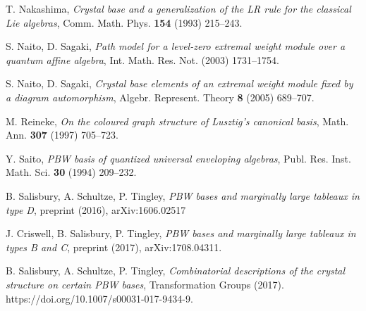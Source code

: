 \documentclass[leqno,11pt]{amsart}
\numberwithin{equation}{section}
\begin{document}
{\begin{thebibliography}{HK}
T. Nakashima, {\em Crystal base and a generalization of the LR rule for the classical Lie algebras}, Comm. Math. Phys. \textbf{154} (1993) 215--243.

S. Naito, D. Sagaki, {\em Path model for a level-zero extremal weight module over a quantum affine algebra}, Int. Math. Res. Not. (2003) 1731--1754.

S. Naito, D. Sagaki, {\em Crystal base elements of an extremal weight module fixed by a diagram automorphism}, Algebr. Represent. Theory \textbf{8} (2005) 689--707.

M. Reineke,
{\em On the coloured graph structure of Lusztig's canonical basis}, Math. Ann. \textbf{307} (1997) 705--723.

Y. Saito, {\em  PBW basis of quantized universal enveloping algebras}, Publ. Res. Inst. Math. Sci. \textbf{30} (1994) 209--232.

B. Salisbury, A. Schultze, P. Tingley, {\em PBW bases and marginally large tableaux in type D}, preprint (2016), arXiv:1606.02517

J. Criswell, B. Salisbury, P. Tingley, {\em PBW bases and marginally large tableaux in types B and C}, preprint (2017), arXiv:1708.04311.


B. Salisbury, A. Schultze, P. Tingley, {\em Combinatorial descriptions of the crystal structure on certain PBW bases}, Transformation Groups (2017). https://doi.org/10.1007/s00031-017-9434-9.

\end{thebibliography}
}
\end{document}
